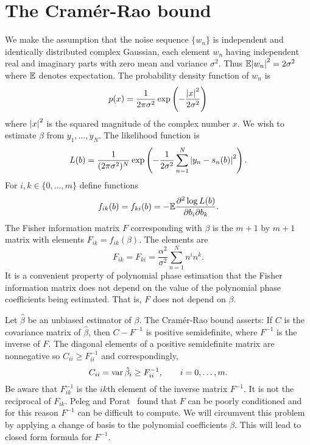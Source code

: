 \documentclass[journal,10pt]{IEEEtran}
\begin{document}
\section{The Cram\'{e}r-Rao bound} \label{sec_crb}

We make the assumption that the noise sequence $\{ w_n \}$ is independent and identically distributed complex Gaussian, each element $w_n$ having independent real and imaginary parts with zero mean and variance $\sigma^2$. Thus ${\mathbb E}{\left| w_n \right|}^2 = 2\sigma^2$ where ${\mathbb E}$ denotes expectation.  The probability density function of $w_n$ is 
\[
p(x) = \frac{1}{2 \pi \sigma^2} \exp\left( -\frac{{\left| x \right|}^2}{2\sigma^2} \right)
\]
where ${\left| x \right|}^2$ is the squared magnitude of the complex number $x$.  We wish to estimate $\beta$ from $y_1, \dots, y_N$.  The likelihood function is
\[
L(b) = \frac{1}{(2 \pi \sigma^2)^N} \exp\left( - \frac{1}{2\sigma^{2}} \sum_{n=1}^N {\left| y_n -  s_n(b)  \right|}^2 \right).
\]
For $i,k \in \{0, \dots, m\}$ define functions 
\[
f_{ik}(b) = f_{ki}(b) = -{\mathbb E} \frac{ \partial^2 \log L(b) }{ \partial b_{i} \partial b_{k}}.
\]  
The Fisher information matrix $F$ corresponding with $\beta$ is the $m+1$ by $m+1$ matrix with elements $F_{i k} = f_{ik}(\beta)$.  The elements are
\[
F_{ik} = F_{ki} = \frac{\alpha^2}{\sigma^2}\sum_{n=1}^{N} n^{i}n^{k}.
\]
It is a convenient property of polynomial phase estimation that the Fisher information matrix does not depend on the value of the polynomial phase coefficients being estimated.  That is, $F$ does not depend on $\beta$.

Let $\hat{\beta}$ be an unbiased estimator of $\beta$.  The Cram\'{e}r-Rao bound asserts:  If $C$ is the covariance matrix of $\hat{\beta}$, then $C - F^{-1}$ is positive semidefinite, where $F^{-1}$ is the inverse of $F$.  The diagonal elements of a positive semidefinite matrix are nonnegative so $C_{ii} \geq F^{-1}_{ii}$ and correspondingly, 
\[
C_{ii} = \operatorname{var} \hat{\beta}_{i} \geq F_{ii}^{-1}, \qquad i=0,\dots,m.
\]  
Be aware that $F_{ik}^{-1}$ is the $ik$th element of the inverse matrix $F^{-1}$.  It is not the reciprocal of $F_{ik}$.  Peleg and Porat~\cite{Peleg1991_CRB_PPS_1991} found that $F$ can be poorly conditioned and for this reason $F^{-1}$ can be difficult to compute.   We will circumvent this problem by applying a change of basis to the polynomial coefficients $\beta$.  This will lead to closed form formula for $F^{-1}$.  
\end{document}
